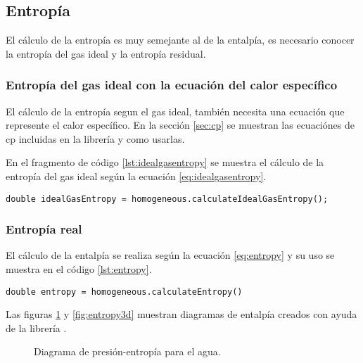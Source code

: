 \subsection{Entropía}

	El cálculo de la entropía es muy semejante al de la entalpía, es necesario conocer la entropía del gas ideal y la entropía residual.

\subsubsection{Entropía del gas ideal con la ecuación del calor específico}

	El cálculo de la entropía segun el gas ideal, también necesita una ecuación que represente el calor específico. En la sección \ref{sec:cp} se muestran las ecuaciónes de cp incluidas en la librería y como usarlas.

	En el fragmento de código \ref{lst:idealgasentropy} se muestra el cálculo de la entropía del gas ideal según la ecuación \ref{eq:idealgasentropy}. 

	\begin{lstlisting}[label={lst:idealgasentropy},caption={Cálculo de la entropía absoluta del gas ideal.}]
	double idealGasEntropy = homogeneous.calculateIdealGasEntropy();
	\end{lstlisting}

\subsubsection{Entropía real}

	El cálculo de la entalpía se realiza según la ecuación \ref{eq:entropy} y su uso se muestra en el código \ref{lst:entropy}.

\begin{lstlisting}[label={lst:entropy},caption={Cálculo de la entropía absoluta.}]
	double entropy = homogeneous.calculateEntropy()
\end{lstlisting}

	Las figuras \ref{fig:2dentropy} y \ref{fig:entropy3d} muestran diagramas de entalpía creados con ayuda de la librería \Materia.


\begin{figure}[!h]
	\centering	
	\caption{Diagrama de presión-entropía para el agua.}\label{fig:2dentropy}
\end{figure}

